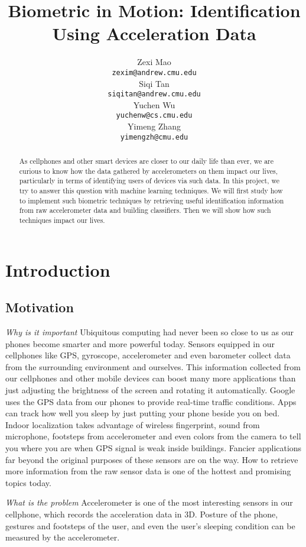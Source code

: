 \documentclass{article} %
\title{Biometric in Motion: Identification Using Acceleration Data}
\author{
Zexi Mao\\
\texttt{zexim@andrew.cmu.edu} \\
\And
Siqi Tan \\
\texttt{siqitan@andrew.cmu.edu} \\
\AND
Yuchen Wu\\
\texttt{yuchenw@cs.cmu.edu} \\
\And
Yimeng Zhang \\
\texttt{yimengzh@cmu.edu} \\
}
\begin{document}
\maketitle

\begin{abstract}
As cellphones and other smart devices are closer to our daily life than ever, we are curious to know how the data gathered by accelerometers on them impact our lives, particularly in terms of identifying users of devices via such data. In this project, we try to answer this question with machine learning techniques. We will first study how to implement such biometric techniques by retrieving useful identification information from raw accelerometer data and building classifiers. Then we will show how such techniques impact our lives.
\end{abstract}

\section{Introduction}

\subsection{Motivation}

\emph{Why is it important} Ubiquitous computing had never been so close to us as our phones become smarter and more powerful today. Sensors equipped in our cellphones like GPS, gyroscope, accelerometer and even barometer collect data from the surrounding environment and ourselves. This information collected from our cellphones and other mobile devices can boost many more applications than just adjusting the brightness of the screen and rotating it automatically. Google uses the GPS data from our phones to provide real-time traffic conditions. Apps can track how well you sleep by just putting your phone beside you on bed. Indoor localization takes advantage of wireless fingerprint, sound from microphone, footsteps from accelerometer and even colors from the camera to tell you where you are when GPS signal is weak inside buildings. Fancier applications far beyond the original purposes of these sensors are on the way. How to retrieve more information from the raw sensor data is one of the hottest and promising topics today.

\emph{What is the problem} Accelerometer is one of the most interesting sensors in our cellphone, which records the acceleration data in 3D. Posture of the phone, gestures and footsteps of the user, and even the user's sleeping condition can be measured by the accelerometer.
\end{document}
